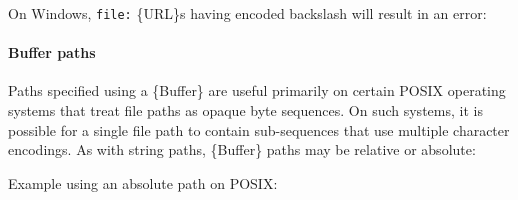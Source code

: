 On Windows, \texttt{file:} \{URL\}s having encoded backslash will result
in an error:

\begin{Shaded}
\begin{Highlighting}[]
 \OperatorTok{;}

\NormalTok{(} \NormalTok{(}\NormalTok{))}\OperatorTok{;}
\NormalTok{(} \NormalTok{(}\NormalTok{))}\OperatorTok{;}
\end{Highlighting}
\end{Shaded}

\paragraph{Buffer paths}\label{buffer-paths}

Paths specified using a \{Buffer\} are useful primarily on certain POSIX
operating systems that treat file paths as opaque byte sequences. On
such systems, it is possible for a single file path to contain
sub-sequences that use multiple character encodings. As with string
paths, \{Buffer\} paths may be relative or absolute:

Example using an absolute path on POSIX:

\begin{Shaded}
\begin{Highlighting}[]
 \OperatorTok{;}
\NormalTok{ \{ }\NormalTok{ \} } \OperatorTok{;}

\OperatorTok{;}
\NormalTok{ \{}
\OperatorTok{=}  \NormalTok{(}\NormalTok{(}\NormalTok{)}\OperatorTok{,} \NormalTok{)}\OperatorTok{;}
\NormalTok{\} }\NormalTok{ \{}
  \NormalTok{()}\OperatorTok{;}
\NormalTok{\}}
\end{Highlighting}
\end{Shaded}

